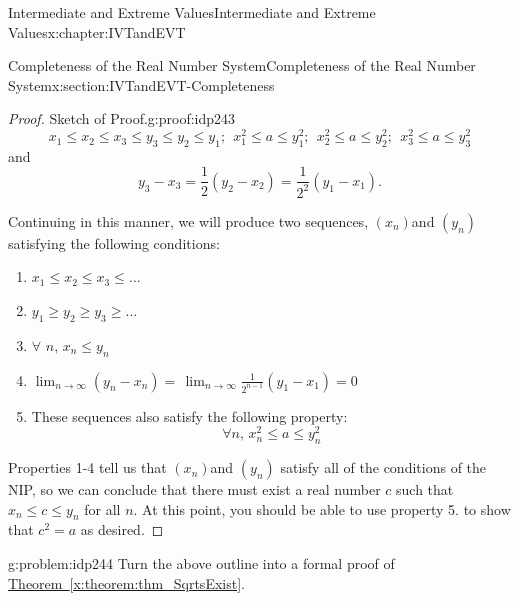 \begin{chapterptx}{Intermediate and Extreme Values}{}{Intermediate and Extreme Values}{}{}{x:chapter:IVTandEVT}
\begin{sectionptx}{Completeness of the Real Number System}{}{Completeness of the Real Number System}{}{}{x:section:IVTandEVT-Completeness}
\begin{proof}{Sketch of Proof.}{g:proof:idp243}
			\begin{equation*}
				x_1\leq x_2\leq x_3\leq y_3\leq y_2\leq y_1;\ \   x_1^2\leq a\leq y_1^2;\ \  x_2^2\leq a\leq y_2^2;\ \   x_3^2\leq a\leq y_3^2
			\end{equation*}
			and%
			\begin{equation*}
				y_3-x_3=\frac{1}{2}\left(y_2-x_2\right)=\frac{1}{2^2}\left(y_1-x_1\right)\text{.}
			\end{equation*}
			\par
			Continuing in this manner, we will produce two sequences, \(\left(x_n\right)\)and \(\left(y_n\right)\) satisfying the following conditions:%
			\begin{enumerate}
				\item{}\(\displaystyle x_1\leq x_2\leq x_3\leq\ldots\)%
				\item{}\(\displaystyle y_1\geq y_2\geq y_3\geq\ldots\)%
				\item{}\(\forall\) \(n\), \(x_n\leq y_n\)%
				\item{}\(\displaystyle \lim_{n\rightarrow\infty}\left(y_n-x_n\right)=\,\lim_{n\rightarrow\infty}\frac{1}{2^{n-1}}\left(y_1-x_1\right)=0\)%
				\item{}These sequences also satisfy the following property:%
				\begin{equation*}
					\forall n,\,x_n^2\leq a\leq y_n^2
				\end{equation*}
			\end{enumerate}
			\par
			Properties 1-4 tell us that \(\left(x_n\right)\)and \(\left(y_n\right)\) satisfy all of the conditions of the NIP, so we can conclude that there must exist a real number \(c\) such that \(x_n\leq c\leq y_n\) for all \(n\). At this point, you should be able to use property 5. to show that \(c^2=a\) as desired.%
		\end{proof}
		\begin{problem}{}{g:problem:idp244}%
			 Turn the above outline into a formal proof of \hyperref[x:theorem:thm_SqrtsExist]{Theorem~{\xreffont\ref{x:theorem:thm_SqrtsExist}}}.%
		\end{problem}

\end{sectionptx}
\end{chapterptx}
